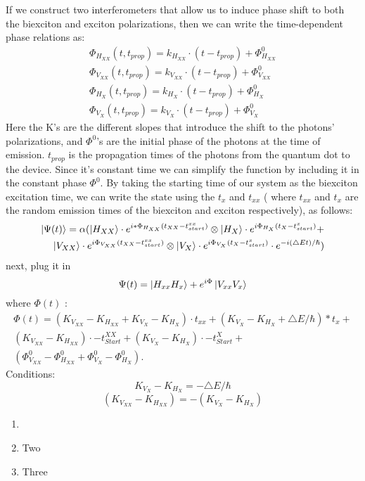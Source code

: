 If we construct two interferometers that allow us to induce phase shift to both the biexciton and exciton polarizations, then we can write the time-dependent phase relations as: 
\begin{equation}
\begin{aligned} 
		&\Phi_{H_{XX}}{(t,t_{prop})} = k_{H_{XX}}\cdot(t-t_{prop}) + \Phi^0_{H_{XX}} & \\	&\Phi_{V_{XX}}{(t,t_{prop})} = k_{V_{XX}}\cdot(t-t_{prop}) + \Phi^0_{V_{XX}} \\
        &\Phi_{H_{X}}{(t,t_{prop})} = k_{H_{X}}\cdot(t-t_{prop}) + \Phi^0_{H_{X}} &\\
		&\Phi_{V_{X}}{(t,t_{prop})} = k_{V_{X}}\cdot(t-t_{prop}) + \Phi^0_{V_{X}} 
\end{aligned}
\end{equation}
Here the  K's are the different slopes that introduce the shift to the photons' polarizations, and  $\Phi^0$'s are the initial phase of the photons at the time of emission. $t_{prop}$ is the propagation times of the photons from the quantum dot to the device. Since it's constant time we can simplify the function by including it in the constant phase $\Phi^0$.
By taking the starting time of our system as the biexciton excitation time, we can write the state using the $t_x$ and $t_{xx}$ ( where $t_{xx}$ and $t_{x}$ are the random emission times of the biexciton and exciton respectively), as follows:
\begin{equation}
\begin{split}
		\ket{\Psi(t)}= \alpha(\ket{H_{XX}}\cdot e^{i*\Phi_{H_{XX}}(t_{XX}-t^{xx}_{start})} \otimes 
		\ket{H_{X}}\cdot e^{i\Phi_{H_{X}}(t_{X}-t^{x}_{start})}+\\
        \ket{V_{XX}}\cdot e^{i\Phi_{V_{XX}}(t_{XX}-t^{xx}_{start})} \otimes 
		\ket{V_{X}}\cdot e^{i\Phi_{V_{X}}(t_{X}-t^{x}_{start})}\cdot e^{-i(\triangle Et)/\hslash})	
  \end{split}
\end{equation} 
next, plug it in
\begin{equation}
	\Psi(t) = \ket{H_{xx}H_x}+e^{i\Phi}\ket{V_{xx}V_x}
\end{equation}
where $\Phi(t)$ :
\begin{equation}
\begin{split}  
	\Phi(t) = (K_{V_{XX}}-K_{H_{XX}}+K_{V_X} - K_{H_X})\cdot t_{xx}+(K_{V_X}-K_{H_X} + \triangle E/\hbar)*t_x +\\
 (K_{V_{XX}} - K_{H_{XX}})\cdot-t^{XX}_{Start} +(K_{V_X}-K_{H_X})\cdot-t^X_{Start}+\\
 (\Phi^0_{V_{XX}}-\Phi^0_{H_{XX}}+\Phi^0_{V_{X}}-\Phi^0_{H_{X}}).
 \end{split}
\end{equation}
Conditions:
\begin{equation}
	K_{V_X}-K_{H_X} = -\triangle E/\hbar
\end{equation}
\begin{equation}
	(K_{V_{XX}} -K_{H_{XX}}) = -(K_{V_X}-K_{H_X})
\end{equation}
\begin{enumerate}
	\item 
	\item  Two
	\item  Three
\end{enumerate}
